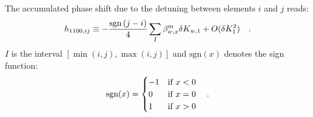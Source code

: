 The accumulated phase shift due to the detuning between elements $i$ and
$j$ reads:
%
\begin{equation}
  h_{1100,ij} \equiv -\frac{\text{sgn}\left( j - i \right)}{4}\sum\limits_{I}\beta_{w,x}^\text{m} \delta K_{w,1} + O(\delta
  K_1^2)\quad .
  \label{eq_h11000-j}
\end{equation}
%
$I$ is the interval $[\min(i,j), \max (i,j)]$ and $\text{sgn}(x)$ denotes the sign function:
%
\begin{equation}
    \text{sgn}(x) =
    \begin{cases}
        -1 & \text{if } x<0\\
        0 &\text{if } x=0\\
        1 &\text{if } x >0
    \end{cases}
    \quad .
    \label{eq_def_sgn_fun}
\end{equation}
%
\label{sec:phasebeating_K1_first}

